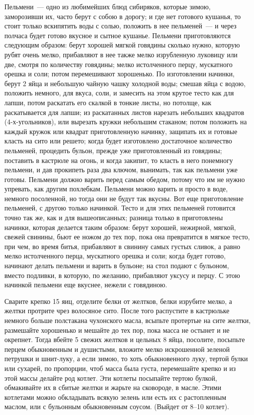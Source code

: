 
Пельмени~--- одно из любимейших блюд сибиряков, которые зимою, заморозивши их, часто берут с собою в дорогу; и где нет готового кушанья, то стоит только вскипятить воды с солью, положить в нее пельменей~--- и через полчаса будет готово вкусное и сытное кушанье. Пельмени приготовляются следующим образом: берут хорошей мягкой говядины сколько нужно, которую рубят очень мелко, прибавляют в нее также мелко изрубленную луковицу или две, смотря по количеству говядины; мелко истолченного перцу, мускатного орешка и соли; потом перемешивают хорошенько. По изготовлении начинки, берут 2 яйца и небольшую чайную чашку холодной воды; смешав яйца с водою, положить немного, для вкуса, соли, и замесить на этом крутое тесто как для лапши, потом раскатать его скалкой в тонкие листы, но потолще, как раскатывается для лапши; из раскатанных листов нарезать небольших квадратов (4-х-угольников), или вырезать кружки небольшим стаканом; потом положить на каждый кружок или квадрат приготовленную начинку, защипать их и готовые класть на сито или решето; когда будет изготовлено достаточное количество пельменей, процедить бульон, прежде уже приготовленный из говядины; поставить в кастрюле на огонь, и когда закипит, то класть в него понемногу пельмени, и дав прокипеть раза два ключом, вынимать, так как пельмени уже готовы. Пельмени должно варить перед самым обедом, потому что им не нужно упревать, как другим похлебкам. Пельмени можно варить и просто в воде, немного посоленной, но тогда они не будут так вкусны. Вот еще приготовление пельменей, с другою только начинкой. Тесто и для этих пельменей готовится точно так же, как и для вышеописанных; разница только в приготовлены начинки, которая делается таким образом: берут хорошей, нежирной, мягкой, свежей свинины, бьют ее ножом до тех пор, пока она превратится в мягкое тесто, при чем, во время битья, прибавляют в свинину самых густых сливок, а равно мелко истолченного перца, мускатного орешка и соли; когда будет готово, начинают делать пельмени и варить в бульоне; на стол подают с бульоном, вместо подливки, в которую, по желанию, прибавляют уксусу и перцу. С этою начинкой пельмени еще вкуснее, нежели с говядиною. 


Сварите крепко 15 яиц, отделите белки от желтков, белки изрубите мелко, а желтки протрите чрез волосяное сито. После того распустите в кастрюльке немного больше полстакана чухонского масла, всыпьте протертые на сите желтки, размешайте хорошенько и мешайте до тех пор, пока масса не остынет и не окрепнет. Тогда вбейте 5 свежих желтков и цельных 8 яйца, посолите, посыпьте перцем обыкновенным и душистыми, вложите мелко искрошенной зеленой петрушки и шнит-луку, а если зимою, то хоть обыкновенного луку, тертой булки или сухарей, по пропорции, чтоб масса была густа, перемешайте крепко и из этой массы делайте род котлет. Эти котлеты посыпайте тертою булкой, обмакивайте их в сбитые желтки и жарьте на сковороде, в масле. Этими котлетами можно обкладывать всякую зелень или есть их с растопленным маслом, или с бульонным обыкновенным соусом. (Выйдет от 8--10 котлет). 


